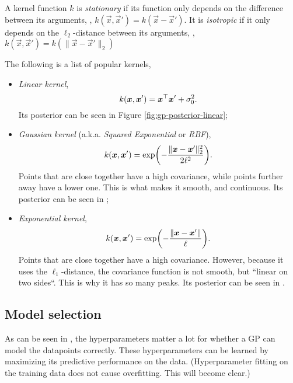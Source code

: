 \begin{definition}
  A kernel function $k$ is \textit{stationary} if its function only depends on
  the difference between its arguments, \ie,
  $k(\vec{x},\vec{x}')=k(\vec{x}-\vec{x}')$. It is \textit{isotropic} if it only
  depends on the $\ell_2$-distance between its arguments, \ie,
  $k(\vec{x},\vec{x}')=k(\lVert \vec{x}-\vec{x}' \rVert_2)$
\end{definition}

The following is a list of popular kernels,
\begin{itemize}
  \item \textit{Linear kernel}, \[
      k(\bm{x},\bm{x}') = \bm{x}^\top\bm{x}' + \sigma_0^2.
    \]
    Its posterior can be seen in Figure \ref{fig:gp-posterior-linear};

  \item \textit{Gaussian kernel} (a.k.a. \textit{Squared Exponential} or
    \textit{RBF}), \[
      k(\vec{x},\vec{x}') = \exp \lft( -\frac{\lVert \vec{x}-\vec{x}'
      \rVert^2_2}{2\ell^2} \rgt).
    \]
    Points that are close together have a high covariance, while points further
    away have a lower one. This is what makes it smooth, and continuous. Its
    posterior can be seen in ;

  \item \textit{Exponential kernel}, \[
      k(\vec{x},\vec{x}') = \exp \lft( -\frac{\lVert \vec{x}-\vec{x}' \rVert}{\ell} \rgt).
    \]
    Points that are close together have a high covariance. However, because it
    uses the $\ell_1$-distance, the covariance function is not smooth, but
    ``linear on two sides``.  This is why it has so many peaks. Its posterior
    can be seen in .
\end{itemize}

\subsection{Model selection}


As can be seen in
,
the hyperparameters matter a lot for whether a GP can model the datapoints
correctly. These hyperparameters can be learned by maximizing its predictive
performance on the data. (Hyperparameter fitting on the training data does not
cause overfitting. This will become clear.)

